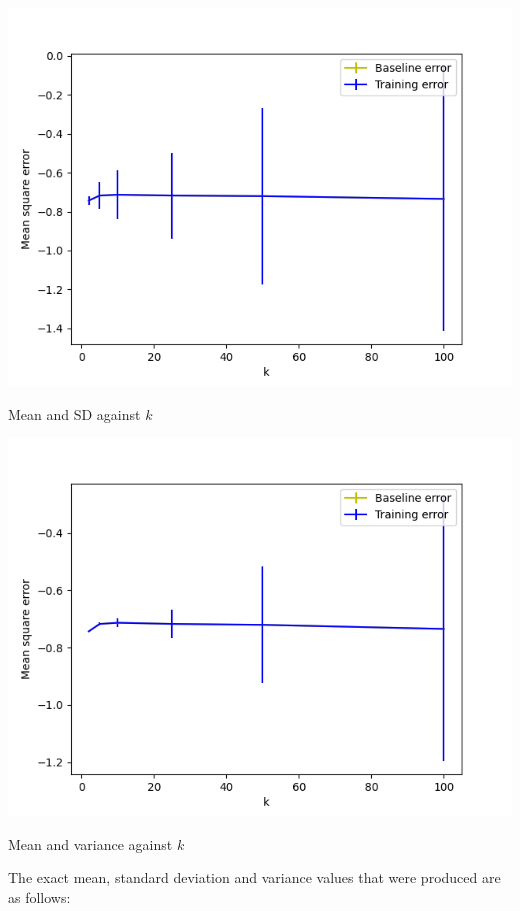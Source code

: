 \documentclass[12pt]{article}
\begin{document}
\begin{center}
    \includegraphics[scale=0.65]{fig_9.png}
    
    Mean and SD against $k$
    
    \includegraphics[scale=0.65]{fig_10.png}
    
    Mean and variance against $k$
\end{center}

The exact mean, standard deviation and variance values that were produced are as follows:
\end{document}
